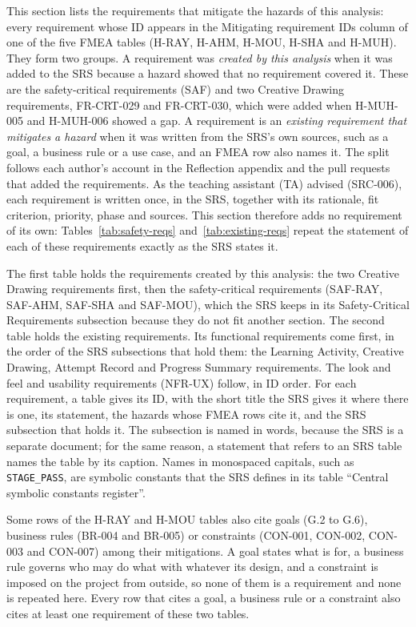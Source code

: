 \documentclass{article}
\begin{document}
This section lists the requirements that mitigate the hazards of this analysis:
every requirement whose ID appears in the Mitigating requirement IDs column of
one of the five FMEA tables (H-RAY, H-AHM, H-MOU, H-SHA and H-MUH). They form
two groups. A requirement was \emph{created by this analysis} when it was added
to the SRS because a hazard showed that no requirement covered it. These are the
safety-critical requirements (SAF) and two Creative Drawing requirements,
FR-CRT-029 and FR-CRT-030, which were added when H-MUH-005 and H-MUH-006 showed
a gap. A requirement is an \emph{existing requirement that mitigates a hazard}
when it was written from the SRS's own sources, such as a goal, a business rule
or a use case, and an FMEA row also names it. The split follows each author's
account in the Reflection appendix and the pull requests that added the
requirements. As the teaching assistant (TA) advised (SRC-006), each
requirement is written once, in the SRS, together with its rationale, fit
criterion, priority, phase and sources. This section therefore adds no
requirement of its own: Tables~\ref{tab:safety-reqs} and~\ref{tab:existing-reqs}
repeat the statement of each of these requirements exactly as the SRS states it.

The first table holds the requirements created by this analysis: the two
Creative Drawing requirements first, then the safety-critical requirements
(SAF-RAY, SAF-AHM, SAF-SHA and SAF-MOU), which the SRS keeps in its
Safety-Critical Requirements subsection because they do not fit another section.
The second table holds the existing requirements. Its functional requirements
come first, in the order of the SRS subsections that hold them: the Learning
Activity, Creative Drawing, Attempt Record and Progress Summary requirements.
The look and feel and usability requirements (NFR-UX) follow, in ID order. For
each requirement, a table gives its ID, with the short title the SRS gives it
where there is one, its statement, the hazards whose FMEA rows cite it, and the
SRS subsection that holds it. The subsection is named in words, because the SRS
is a separate document; for the same reason, a statement that refers to an SRS
table names the table by its caption. Names in monospaced capitals, such as
\texttt{STAGE\_PASS}, are symbolic constants that the SRS defines in its table
``Central symbolic constants register''.

Some rows of the H-RAY and H-MOU tables also cite goals (G.2 to G.6), business
rules (BR-004 and BR-005) or constraints (CON-001, CON-002, CON-003 and CON-007)
among their mitigations. A goal states what \progname{} is for, a business rule
governs who may do what with \progname{} whatever its design, and a constraint
is imposed on the project from outside, so none of them is a requirement and
none is repeated here. Every row that cites a goal, a business rule or a
constraint also cites at least one requirement of these two tables.
\end{document}
